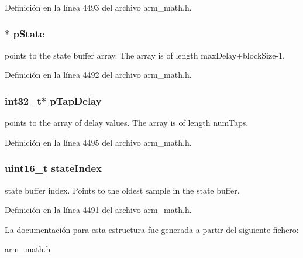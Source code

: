 Definición en la línea 4493 del archivo arm\+\_\+math.\+h.

\subsubsection[{\texorpdfstring{p\+State}{pState}}]{$\ast$ p\+State}\hypertarget{structarm__fir__sparse__instance__f32_a335c87e6fdc4b96601d95a5de8b9c463}{}\label{structarm__fir__sparse__instance__f32_a335c87e6fdc4b96601d95a5de8b9c463}
points to the state buffer array. The array is of length max\+Delay+block\+Size-\/1. 

Definición en la línea 4492 del archivo arm\+\_\+math.\+h.

\subsubsection[{\texorpdfstring{p\+Tap\+Delay}{pTapDelay}}]{\setlength{\rightskip}{0pt plus 5cm}int32\+\_\+t$\ast$ p\+Tap\+Delay}\hypertarget{structarm__fir__sparse__instance__f32_adec00b3793ab4f08edfeb4ea6a9eb6e6}{}\label{structarm__fir__sparse__instance__f32_adec00b3793ab4f08edfeb4ea6a9eb6e6}
points to the array of delay values. The array is of length num\+Taps. 

Definición en la línea 4495 del archivo arm\+\_\+math.\+h.

\subsubsection[{\texorpdfstring{state\+Index}{stateIndex}}]{\setlength{\rightskip}{0pt plus 5cm}uint16\+\_\+t state\+Index}\hypertarget{structarm__fir__sparse__instance__f32_a566a0cb53437e48b9a3bf18e5b03d8aa}{}\label{structarm__fir__sparse__instance__f32_a566a0cb53437e48b9a3bf18e5b03d8aa}
state buffer index. Points to the oldest sample in the state buffer. 

Definición en la línea 4491 del archivo arm\+\_\+math.\+h.



La documentación para esta estructura fue generada a partir del siguiente fichero\+:\begin{DoxyCompactItemize}
\item 
\hyperlink{arm__math_8h}{arm\+\_\+math.\+h}\end{DoxyCompactItemize}
